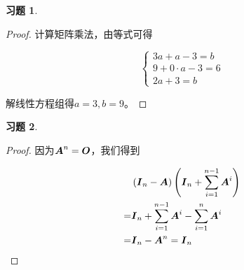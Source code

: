 \documentclass{ctexart}
\newtheorem{problem}{习题}[section]
\begin{document}
\begin{problem}
\end{problem}
\begin{proof}
    计算矩阵乘法，由等式可得

    \begin{equation*}
        \begin{cases}
            3a+a-3=b       \\
            9+0\cdot a-3=6 \\
            2a+3=b
        \end{cases}
    \end{equation*}

    解线性方程组得\(a=3,b=9\)。
\end{proof}

\begin{problem}
\end{problem}
\begin{proof}
    因为\(\boldsymbol{A}^n=\boldsymbol{O}\)，我们得到

    \begin{align*}
          & \left( \boldsymbol{I}_n-\boldsymbol{A} \right)\left( \boldsymbol{I}_n+\sum_{i=1}^{n-1}\boldsymbol{A}^i \right) \\
        = & \boldsymbol{I}_n+\sum_{i=1}^{n-1}\boldsymbol{A}^i-\sum_{i=1}^n\boldsymbol{A}^i          \\
        = & \boldsymbol{I}_n-\boldsymbol{A}^n=\boldsymbol{I}_n
    \end{align*}
\end{proof}
\end{document}
